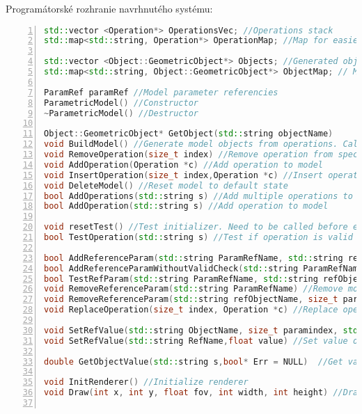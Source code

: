 Programátorské rozhranie navrhnutého systému:
\begin{lstlisting}[numbers=left,language=c++]
std::vector <Operation*> OperationsVec; //Operations stack 
std::map<std::string, Operation*> OperationMap; //Map for easier acces to operations

std::vector <Object::GeometricObject*> Objects; //Generated objects of parametric model
std::map<std::string, Object::GeometricObject*> ObjectMap; // Map for objects of parametric model

ParamRef paramRef //Model parameter referencies
ParametricModel() //Constructor
~ParametricModel() //Destructor

Object::GeometricObject* GetObject(std::string objectName)
void BuildModel() //Generate model objects from operations. Call this to apply modifications
void RemoveOperation(size_t index) //Remove operation from specific index
void AddOperation(Operation *c) //Add operation to model
void InsertOperation(size_t index,Operation *c) //Insert operation to specific position
void DeleteModel() //Reset model to default state
bool AddOperations(std::string s) //Add multiple operations to model
bool AddOperation(std::string s) //Add operation to model

void resetTest() //Test initializer. Need to be called before every test 
bool TestOperation(std::string s) //Test if operation is valid

bool AddReferenceParam(std::string ParamRefName, std::string refObjectName, size_t paramIndex) //Add model parameter
bool AddReferenceParamWithoutValidCheck(std::string ParamRefName, std::string refObjectName, size_t paramIndex) 
bool TestRefParam(std::string ParamRefName, std::string refObjectName, size_t paramIndex) //Test if parameter can be added to object
void RemoveReferenceParam(std::string ParamRefName) //Remove model parameter
void RemoveReferenceParam(std::string refObjectName, size_t paramIndex) //Remove model parameter from specific object  
void ReplaceOperation(size_t index, Operation *c) //Replace operation

void SetRefValue(std::string ObjectName, size_t paramindex, std::string value) //Set value of operation parameter 
void SetRefValue(std::string RefName,float value) //Set value of parameter

double GetObjectValue(std::string s,bool* Err = NULL)  //Get value in string form

void InitRenderer() //Initialize renderer
void Draw(int x, int y, float fov, int width, int height) //Draw  with OpenGL


\end{lstlisting}
